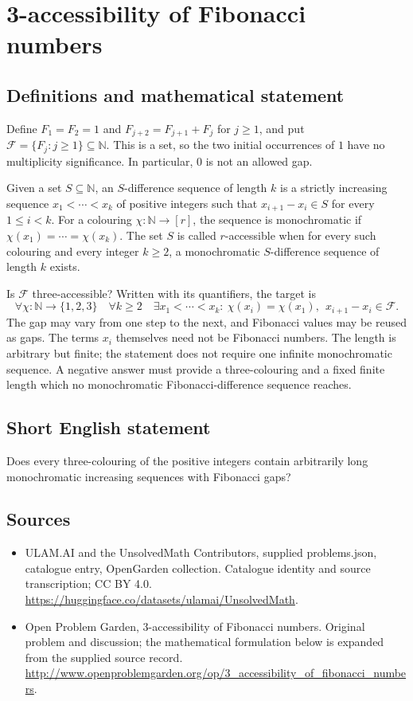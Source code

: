 \documentclass[11pt,a4paper]{article}
\begin{document}
\section*{3-accessibility of Fibonacci numbers}\label{statement}

\subsection{Definitions and mathematical statement}
Define $F_1=F_2=1$ and $F_{j+2}=F_{j+1}+F_j$ for $j\ge1$, and put
$\mathcal F=\{F_j:j\ge1\}\subseteq\mathbb N$. This is a set, so the two
initial occurrences of $1$ have no multiplicity significance. In particular,
$0$ is not an allowed gap.

Given a set $S\subseteq\mathbb N$, an $S$-difference sequence of length
$k$ is a strictly increasing sequence $x_1<\cdots<x_k$ of positive integers
such that $x_{i+1}-x_i\in S$ for every $1\le i<k$.
For a colouring $\chi:\mathbb N\to[r]$, the sequence is monochromatic if
$\chi(x_1)=\cdots=\chi(x_k)$. The set $S$ is called $r$-accessible when
for every such colouring and every integer $k\ge2$, a monochromatic
$S$-difference sequence of length $k$ exists.

Is $\mathcal F$ three-accessible? Written with its quantifiers, the target is
\[
 \forall\chi:\mathbb N\to\{1,2,3\}\quad\forall k\ge2\quad
 \exists x_1<\cdots<x_k:
 \ \chi(x_i)=\chi(x_1),\ \ x_{i+1}-x_i\in\mathcal F.
\]
The gap may vary from one step to the next, and Fibonacci values may be
reused as gaps. The terms $x_i$ themselves need not be Fibonacci numbers.
The length is arbitrary but finite; the statement does not require one
infinite monochromatic sequence. A negative answer must provide a
three-colouring and a fixed finite length which no monochromatic
Fibonacci-difference sequence reaches.
\subsection{Short English statement}
Does every three-colouring of the positive integers contain arbitrarily long monochromatic increasing sequences with Fibonacci gaps?
\subsection{Sources}
\begin{itemize}
\item[S1] ULAM.AI and the UnsolvedMath Contributors, supplied problems.json, catalogue entry, OpenGarden collection. Catalogue identity and source transcription; CC BY 4.0.
\url{https://huggingface.co/datasets/ulamai/UnsolvedMath}.
\item[S2] Open Problem Garden, 3-accessibility of Fibonacci numbers. Original problem and discussion; the mathematical formulation below is expanded from the supplied source record.
\url{http://www.openproblemgarden.org/op/3_accessibility_of_fibonacci_numbers}.
\end{itemize}
\end{document}
